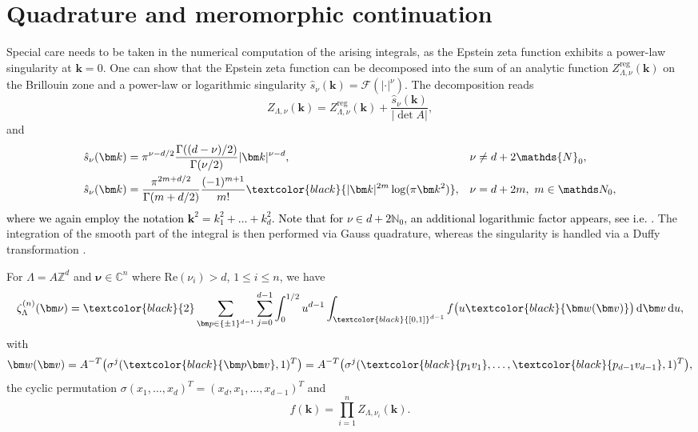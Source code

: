 \documentclass[]{amsart}
\numberwithin{mythm}{section}
\newcommand{\new}[1]{{\textcolor{black}{#1}}}
\begin{document}
\section{Quadrature and meromorphic continuation}
\label{sec:num_int}
Special care needs to be taken in the numerical computation of the arising integrals, as the Epstein zeta function exhibits a power-law singularity at $\bm k=0$. One can show that the Epstein zeta function can be decomposed into the sum of an analytic function $Z_{\Lambda,\nu}^{\mathrm{reg}}(\bm k)$ on the Brillouin zone and a power-law or logarithmic singularity $\hat s_\nu(\bm k)=\mathcal F (\vert \bm \cdot \vert^\nu) $. The decomposition reads \cite{buchheit2024computation,buchheit2024epstein}
\[
Z_{\Lambda,\nu}(\bm k)=Z_{\Lambda,\nu}^{\mathrm{reg}}(\bm k) +\frac{\hat s_\nu(\bm k)}{\vert \det A\vert},
\]
and 
\begin{align*}
\hat s_\nu(\bm k) & = \pi^{\nu-d/2}\frac{ \Gamma ((d-\nu)/2)}{\Gamma(\nu/2) } |\bm k|^{\nu-d}, && \nu\neq d+2\mathds {N}_0, \\
\hat s_\nu(\bm k) & = \frac{\pi^{2m+d/2}}{\Gamma(m+d/2)}\frac{(-1)^{m+1}}{m!} \new{|\bm k|^{2m} \log (\pi  \bm k^{2})},&& \nu= d+2m,\ m\in \mathds N_0,
\end{align*}
\new{where we again employ the notation $\bm k^2=k_1^2+\ldots+k_d^2$.}
\new{
Note that for $\nu\in d+2\mathds N_0$, an additional logarithmic factor appears, see i.e. \cite[Sec. 2.4]{buchheit2024epstein}.
}
The integration of the smooth part of the integral is then performed via Gauss quadrature, whereas the singularity  is handled via a Duffy transformation \cite{duffy1982quadrature}.
\begin{corollary}
\label{duffy}
    For $\Lambda=A\mathds Z^d$ and $\bm \nu\in \mathds C^n$ where $\mathrm{Re}(\nu_i)>d$, $1\le i\le n$, we have
    $$
    \zeta_\Lambda^{(n)}(\bm \nu) = \new{2}\sum_{\bm p\in \{\pm 1\}^{d - 1} }\sum_{j=0}^{d-1} \int_{0}^{1/2} u^{d-1} \int_{\new{[0,1]}^{d-1}}   f\big(u \new{\bm w (\bm v)}\big)\,\mathrm d \bm v\,\mathrm d u,
    $$
    with 
    $$\bm w(\bm v) =A^{-T}\big(\sigma^j (\new{\bm p \bm v}, 1)^T\big) =A^{-T} \big(\sigma^j (\new{p_1 v_1},\dots ,\new{p_{d-1} v_{d-1}} , 1)^T\big),$$ 
    the cyclic permutation $\sigma (x_1,\dots, x_d)^T = (x_d,x_1,\dots ,x_{d-1})^T$ and
    $$
    f(\bm k) = \prod_{i=1}^n Z_{\Lambda,\nu_i}(\bm k).
    $$
\end{corollary}
\end{document}
